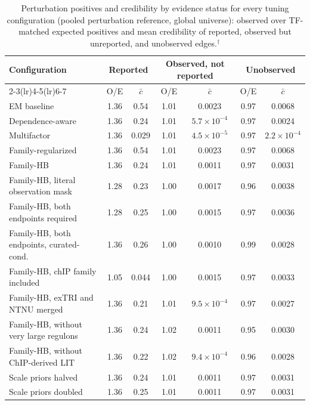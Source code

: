 \begin{table}[htbp]
\centering
\small
\setlength{\tabcolsep}{4pt}
\caption{Perturbation positives and credibility by evidence status for every tuning configuration (pooled perturbation reference, global universe): observed over TF-matched expected positives and mean credibility of reported, observed but unreported, and unobserved edges.$^{\dagger}$}
\label{tab:S-tune-status}
\begin{tabular}{@{}lcccccc@{}}
\toprule
Configuration & \multicolumn{2}{c}{Reported} & \multicolumn{2}{c}{Observed, not reported} & \multicolumn{2}{c}{Unobserved} \\
\cmidrule(lr){2-3}\cmidrule(lr){4-5}\cmidrule(lr){6-7}
 & O/E & $\bar c$ & O/E & $\bar c$ & O/E & $\bar c$ \\
\midrule
EM baseline & 1.36 & 0.54 & 1.01 & 0.0023 & 0.97 & 0.0068 \\
Dependence-aware & 1.36 & 0.24 & 1.01 & $5.7\times 10^{-4}$ & 0.97 & 0.0024 \\
Multifactor & 1.36 & 0.029 & 1.01 & $4.5\times 10^{-5}$ & 0.97 & $2.2\times 10^{-4}$ \\
Family-regularized & 1.36 & 0.54 & 1.01 & 0.0023 & 0.97 & 0.0068 \\
Family-HB & 1.36 & 0.24 & 1.01 & 0.0011 & 0.97 & 0.0031 \\
Family-HB, literal observation mask & 1.28 & 0.23 & 1.00 & 0.0017 & 0.96 & 0.0038 \\
Family-HB, both endpoints required & 1.28 & 0.25 & 1.00 & 0.0015 & 0.97 & 0.0036 \\
Family-HB, both endpoints, curated-cond. & 1.36 & 0.26 & 1.00 & 0.0010 & 0.99 & 0.0028 \\
Family-HB, chIP family included & 1.05 & 0.044 & 1.00 & 0.0015 & 0.97 & 0.0033 \\
Family-HB, exTRI and NTNU merged & 1.36 & 0.21 & 1.01 & $9.5\times 10^{-4}$ & 0.97 & 0.0027 \\
Family-HB, without very large regulons & 1.36 & 0.24 & 1.02 & 0.0011 & 0.95 & 0.0030 \\
Family-HB, without ChIP-derived LIT & 1.36 & 0.22 & 1.02 & $9.4\times 10^{-4}$ & 0.96 & 0.0028 \\
Scale priors halved & 1.36 & 0.24 & 1.01 & 0.0011 & 0.97 & 0.0031 \\
Scale priors doubled & 1.36 & 0.25 & 1.01 & 0.0011 & 0.97 & 0.0031 \\

\end{tabular}
\end{table}
